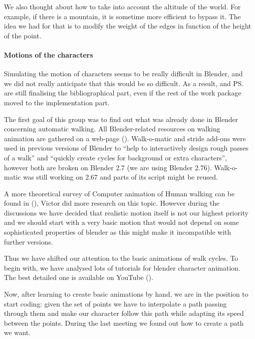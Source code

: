 We also thought about how to take into account the altitude of the world. For example, if there is a mountain, it is sometime more efficient to bypass it. The idea we had for that is to modify the weight of the edges in function of the height of the point. 

\paragraph{Motions of the characters}
\label{WP2_motion}
Simulating the motion of characters seems to be really difficult in Blender, and we did not really anticipate that this would be so difficult. As a result, \vl and \ps are still finalising the bibliographical part, even if the rest of the work package moved to the implementation part.


\par The first goal of this group was to find out what was already done in Blender concerning automatic walking. All Blender-related resources on walking animation are gathered on a web-page (\cite{blwikiwalking}). Walk-o-matic and stride add-ons were used in previous versions of Blender to ``help to interactively design rough passes of a walk'' and ``quickly create cycles for background or extra characters'', however both are broken on Blender 2.7 (we are using Blender 2.76). Walk-o-matic was still working on 2.67 and parts of its script might be reused.

\par A more theoretical survey of Computer animation of Human walking can be found in (\cite{th_walking}), Victor did more research on this topic. However during the discussions we have decided that realistic motion itself is not our highest priority and we should start with a very basic motion that would not depend on some sophisticated properties of blender as this might make it incompatible with further versions.

\par Thus we have shifted our attention to the basic animations of walk cycles. To begin with, we have analysed lots of tutorials for blender character animation. The best detailed one is available on YouTube (\cite{tuto_walk}).


\par Now, after learning to create basic animations by hand, we are in the position to start coding: given the set of points we have to interpolate a path passing through them and make our character follow this path while adapting its speed between the points. During the last meeting we found out how to create a path we want.

